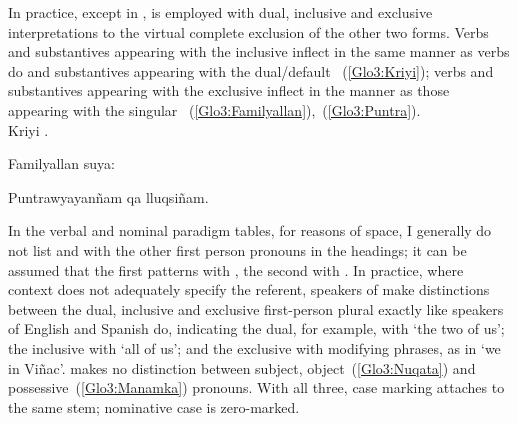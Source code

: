 \noindent
In practice, except in \CH,  is employed with dual, inclusive and exclusive interpretations to the virtual complete exclusion of the other two forms. Verbs and substantives appearing with the inclusive  inflect in the same manner as verbs do and substantives appearing with the dual/default ~(\ref{Glo3:Kriyi}); verbs and substantives appearing with the exclusive  inflect in the manner as those appearing with the singular ~(\ref{Glo3:Familyallan}),~(\ref{Glo3:Puntra}).\\

%
{Kriyi .}%
{}%
{}{}%

%
{Familyallan  suya:}%
{}%
{}{}%

%
{Puntrawyayanñam qa lluqsiñam.}%
{}%
{}{}%

\noindent
In the verbal and nominal paradigm tables, for reasons of space, I generally do not list  and  with the other first person pronouns in the headings; it can be assumed that the first patterns with , the second with . In practice, where context does not adequately specify the referent, speakers of \SYQ{} make distinctions between the dual, inclusive and exclusive first-person plural exactly like speakers of English and Spanish do, indicating the dual, for example, with  ‘the two of us’; the inclusive with  ‘all of us’; and the exclusive with modifying phrases, as in  ‘we in Viñac’. \SYQ{} makes no distinction between subject, object~(\ref{Glo3:Nuqata}) and possessive~(\ref{Glo3:Manamka}) pronouns. With all three, case marking attaches to the same stem; nominative case is zero-marked.\\


